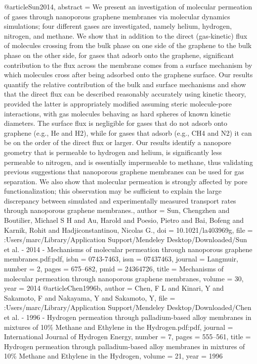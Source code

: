 @article{Sun2014,
abstract = {We present an investigation of molecular permeation of gases through nanoporous graphene membranes via molecular dynamics simulations; four different gases are investigated, namely helium, hydrogen, nitrogen, and methane. We show that in addition to the direct (gas-kinetic) flux of molecules crossing from the bulk phase on one side of the graphene to the bulk phase on the other side, for gases that adsorb onto the graphene, significant contribution to the flux across the membrane comes from a surface mechanism by which molecules cross after being adsorbed onto the graphene surface. Our results quantify the relative contribution of the bulk and surface mechanisms and show that the direct flux can be described reasonably accurately using kinetic theory, provided the latter is appropriately modified assuming steric molecule-pore interactions, with gas molecules behaving as hard spheres of known kinetic diameters. The surface flux is negligible for gases that do not adsorb onto graphene (e.g., He and H2), while for gases that adsorb (e.g., CH4 and N2) it can be on the order of the direct flux or larger. Our results identify a nanopore geometry that is permeable to hydrogen and helium, is significantly less permeable to nitrogen, and is essentially impermeable to methane, thus validating previous suggestions that nanoporous graphene membranes can be used for gas separation. We also show that molecular permeation is strongly affected by pore functionalization; this observation may be sufficient to explain the large discrepancy between simulated and experimentally measured transport rates through nanoporous graphene membranes.},
author = {Sun, Chengzhen and Boutilier, Michael S H and Au, Harold and Poesio, Pietro and Bai, Bofeng and Karnik, Rohit and Hadjiconstantinou, Nicolas G.},
doi = {10.1021/la403969g},
file = {:Users/marc/Library/Application Support/Mendeley Desktop/Downloaded/Sun et al. - 2014 - Mechanisms of molecular permeation through nanoporous graphene membranes.pdf:pdf},
isbn = {0743-7463},
issn = {07437463},
journal = {Langmuir},
number = {2},
pages = {675--682},
pmid = {24364726},
title = {{Mechanisms of molecular permeation through nanoporous graphene membranes}},
volume = {30},
year = {2014}
}
@article{Chen1996b,
author = {Chen, F L and Kinari, Y and Sakamoto, F and Nakayama, Y and Sakamoto, Y},
file = {:Users/marc/Library/Application Support/Mendeley Desktop/Downloaded/Chen et al. - 1996 - Hydrogen permeation through palladium-based alloy membranes in mixtures of 10{\%} Methane and Ethylene in the Hydrogen.pdf:pdf},
journal = {International Journal of Hydrogen Energy},
number = {7},
pages = {555--561},
title = {{Hydrogen permeation through palladium-based alloy membranes in mixtures of 10{\%} Methane and Ethylene in the Hydrogen}},
volume = {21},
year = {1996}
}
